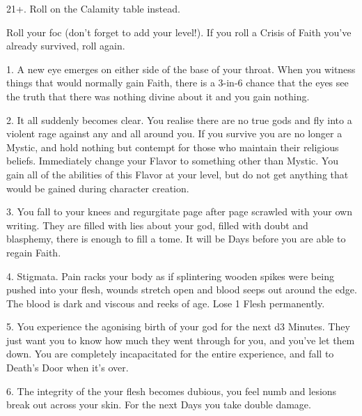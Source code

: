 21+.  Roll on the Calamity table instead.








Roll your {foc} (don't forget to add your level!).   If you roll a Crisis of Faith you've already survived, roll again.



1.  A new eye emerges on either side of the base of your throat. When you witness things that would normally gain Faith, there is a 3-in-6 chance that the eyes see the truth that there was nothing divine about it and you gain nothing.




2. It all suddenly becomes clear. You realise there are no true gods and fly into a violent rage against any and all around you. If you survive you are no longer a Mystic, and hold nothing but contempt for those who maintain their religious beliefs.  Immediately change your Flavor to something other than Mystic.  You gain all of the abilities of this Flavor at your level, but do not get anything that would be gained during character creation.



3.   You fall to your knees and regurgitate page after page scrawled with your own writing. They are filled with lies about your god, filled with doubt and blasphemy, there is enough to fill a tome. It will be Days before you are able to regain Faith.




4. Stigmata. Pain racks your body as if splintering wooden spikes were being pushed into your flesh, wounds stretch open and blood seeps out around the edge. The blood is dark and viscous and reeks of age. Lose 1 Flesh permanently.




5.  You experience the agonising birth of your god for the next d3 Minutes. They just want you to know how much they went through for you, and you've let them down.  You are completely incapacitated for the entire experience, and fall to Death's Door when it's over.




6. The integrity of the your flesh becomes dubious, you feel numb and lesions break out across your skin. For the next Days you take double damage. 



